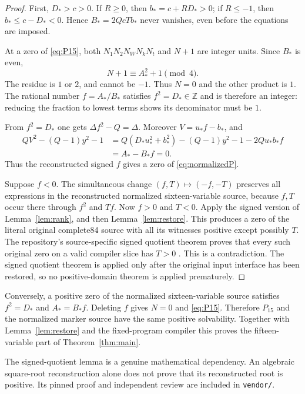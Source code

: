 \documentclass[11pt,a4paper]{article}
\theoremstyle{remark}
\newcommand{\Z}{\mathbb Z}
\newcommand{\code}[1]{\nolinkurl{#1}}
\newcommand{\nf}{N_1}
\newcommand{\nm}{N_2}
\newcommand{\nw}{N_W}
\newcommand{\nk}{N_k}
\newcommand{\nt}{N_t}
\begin{document}
\begin{proof}
First, $D_*>c>0$. If $R\ge0$, then $b_*=c+RD_*>0$; if
$R\le-1$, then $b_*\le c-D_*<0$. Hence $B_*=2QcTb_*$ never
vanishes, even before the equations are imposed.

At a zero of \eqref{eq:P15}, both $\nf\nm\nw\nk\nt$ and
$N+1$ are integer units. Since $B_*$ is even,
\[
 N+1\equiv A_*^2+1\pmod4.
\]
The residue is $1$ or $2$, and cannot be $-1$. Thus $N=0$ and the
other product is $1$. The rational number $f=A_*/B_*$ satisfies
$f^2=D_*\in\Z$ and is therefore an integer: reducing the fraction
to lowest terms shows its denominator must be $1$.

From $f^2=D_*$ one gets $\Delta f^2-Q=\Delta$.
Moreover $V=u_*f-b_*$, and
\begin{align*}
 QV^2-(Q-1)y^2-1
 &=Q(D_*u_*^2+b_*^2)-(Q-1)y^2-1-2Qu_*b_*f\\
 &=A_*-B_*f=0.
\end{align*}
Thus the reconstructed signed $f$ gives a zero of
\eqref{eq:normalizedP}.

Suppose $f<0$. The simultaneous change $(f,T)\mapsto(-f,-T)$
preserves all expressions in the reconstructed normalized sixteen-variable
source, because $f,T$ occur there through $f^2$ and $Tf$.
Now $f>0$ and $T<0$. Apply the signed version of
Lemma~\ref{lem:rank}, and then Lemma~\ref{lem:restore}. This produces
a zero of the literal original complete84 source with all its witnesses
positive except possibly $T$. The repository's source-specific signed
quotient theorem proves that every such original zero on a valid compiler
slice has $T>0$ \cite{signed}. This is a contradiction. The signed
quotient theorem is applied only after the original input interface has
been restored, so no positive-domain theorem is applied prematurely.
\end{proof}

Conversely, a positive zero of the normalized sixteen-variable source
satisfies $f^2=D_*$ and $A_*=B_*f$. Deleting $f$ gives $N=0$ and
\eqref{eq:P15}. Therefore $P_{15}$ and the normalized marker source
have the same positive solvability. Together with
Lemma~\ref{lem:restore} and the fixed-program compiler this proves
the fifteen-variable part of Theorem~\ref{thm:main}.

The signed-quotient lemma is a genuine mathematical dependency. An
algebraic square-root reconstruction alone does not prove that its
reconstructed root is positive. Its pinned proof and independent review
are included in \code{vendor/}.
\end{document}
